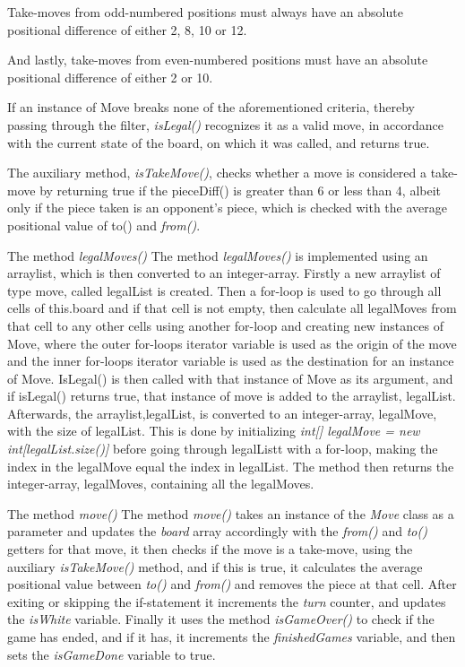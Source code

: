 \documentclass[12pt, a4paper]{article}
\begin{document}
Take-moves from odd-numbered positions must always have an absolute positional difference of either 2, 8, 10 or 12. \par
And lastly, take-moves from even-numbered positions must have an absolute positional difference of either 2 or 10. \par
If an instance of Move breaks none of the aforementioned criteria, thereby passing through the filter, \emph{isLegal()} recognizes it as a valid move, in accordance with the current state of the board, on which it was called, and returns true. \par
The auxiliary method, \emph{isTakeMove()}, checks whether a move is considered a take-move by returning true if the pieceDiff() is greater than 6 or less than 4, albeit only if the piece taken is an opponent's piece, which is checked with the average positional value of to() and \emph{from()}.

The method \emph{legalMoves()}
The method \emph{legalMoves()} is implemented using an arraylist, which is then converted to an integer-array. Firstly a new arraylist of type move, called legalList is created. Then a for-loop is used to go through all cells of this.board and if that cell is not empty, then calculate all legalMoves from that cell to any other cells using another for-loop and creating new instances of Move, where the outer for-loops iterator variable is used as the origin of the move and the inner for-loops iterator variable is used as the destination for an instance of Move. IsLegal() is then called with that instance of Move as its argument, and if isLegal() returns true, that instance of move is added to the arraylist, legalList. Afterwards, the arraylist,legalList, is converted to an integer-array, legalMove, with the size of legalList. This is done by initializing \emph{int[] legalMove = new int[legalList.size()]} before going through legalListt with a for-loop, making the index in the legalMove equal the index in legalList. The method then returns the integer-array, legalMoves, containing all the legalMoves.

The method \emph{move()}
The method \emph{move()} takes an instance of the \emph{Move} class as a parameter and updates the \emph{board} array accordingly with the \emph{from()} and \emph{to()} getters for that move, it then checks if the move is a take-move, using the auxiliary \emph{isTakeMove()} method, and if this is true, it calculates the average positional value between \emph{to()} and \emph{from()} and removes the piece at that cell.
After exiting or skipping the if-statement it increments the \emph{turn} counter, and updates the \emph{isWhite} variable. Finally it uses the method \emph{isGameOver()} to check if the game has ended, and if it has, it increments the \emph{finishedGames} variable, and then sets the \emph{isGameDone} variable to true.
\end{document}
